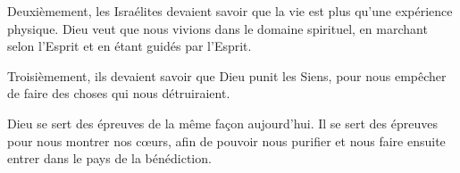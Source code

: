 Deuxièmement, les Israélites devaient savoir que la vie
 est plus qu'une expérience physique.
 Dieu veut que nous vivions dans le domaine spirituel,
 en marchant selon l'Esprit et en étant guidés par l'Esprit.

Troisièmement, ils devaient savoir que Dieu punit les Siens,
 pour nous empêcher de faire des choses qui nous détruiraient.

Dieu se sert des épreuves de la même façon aujourd'hui.
 Il se sert des épreuves pour nous montrer nos cœurs,
 afin de pouvoir nous purifier et nous faire ensuite entrer
 dans le pays de la bénédiction. 

\dvrule





